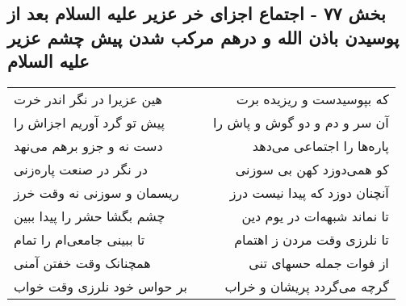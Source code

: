 \begin{center}
\section*{بخش ۷۷ - اجتماع اجزای خر عزیر علیه السلام بعد از پوسیدن باذن الله و درهم مرکب شدن پیش چشم عزیر علیه السلام}
\label{sec:sh077}
\begin{longtable}{l p{0.5cm} r}
هین عزیرا در نگر اندر خرت
&&
که بپوسیدست و ریزیده برت
\\
پیش تو گرد آوریم اجزاش را
&&
آن سر و دم و دو گوش و پاش را
\\
دست نه و جزو برهم می‌نهد
&&
پاره‌ها را اجتماعی می‌دهد
\\
در نگر در صنعت پاره‌زنی
&&
کو همی‌دوزد کهن بی سوزنی
\\
ریسمان و سوزنی نه وقت خرز
&&
آنچنان دوزد که پیدا نیست درز
\\
چشم بگشا حشر را پیدا ببین
&&
تا نماند شبهه‌ات در یوم دین
\\
تا ببینی جامعی‌ام را تمام
&&
تا نلرزی وقت مردن ز اهتمام
\\
همچنانک وقت خفتن آمنی
&&
از فوات جمله حسهای تنی
\\
بر حواس خود نلرزی وقت خواب
&&
گرچه می‌گردد پریشان و خراب
\\
\end{longtable}
\end{center}
